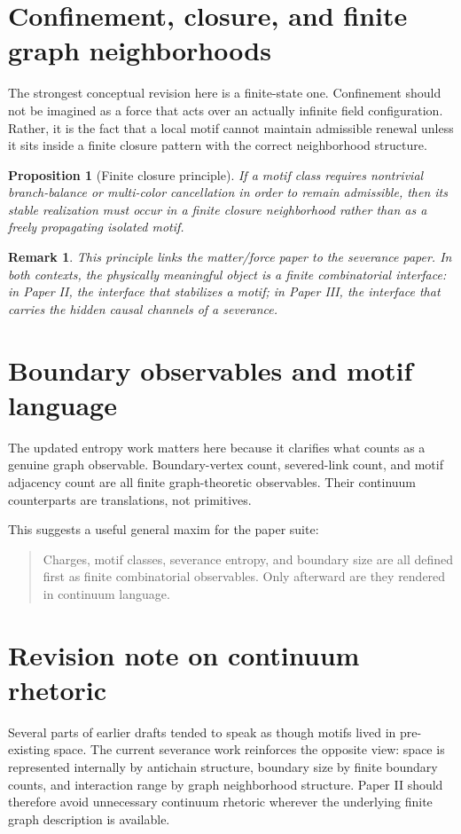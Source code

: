 \documentclass[11pt]{article}
\newtheorem{proposition}{Proposition}
\newtheorem{remark}{Remark}
\begin{document}
\section{Confinement, closure, and finite graph neighborhoods}
The strongest conceptual revision here is a finite-state one. Confinement should not be imagined as a force that acts over an actually infinite field configuration. Rather, it is the fact that a local motif cannot maintain admissible renewal unless it sits inside a finite closure pattern with the correct neighborhood structure.

\begin{proposition}[Finite closure principle]
If a motif class requires nontrivial branch-balance or multi-color cancellation in order to remain admissible, then its stable realization must occur in a finite closure neighborhood rather than as a freely propagating isolated motif.
\end{proposition}

\begin{remark}
This principle links the matter/force paper to the severance paper. In both contexts, the physically meaningful object is a finite combinatorial interface: in Paper II, the interface that stabilizes a motif; in Paper III, the interface that carries the hidden causal channels of a severance.
\end{remark}

\section{Boundary observables and motif language}
The updated entropy work matters here because it clarifies what counts as a genuine graph observable. Boundary-vertex count, severed-link count, and motif adjacency count are all finite graph-theoretic observables. Their continuum counterparts are translations, not primitives.

This suggests a useful general maxim for the paper suite:
\begin{quote}
Charges, motif classes, severance entropy, and boundary size are all defined first as finite combinatorial observables. Only afterward are they rendered in continuum language.
\end{quote}

\section{Revision note on continuum rhetoric}
Several parts of earlier drafts tended to speak as though motifs lived in pre-existing space. The current severance work reinforces the opposite view: space is represented internally by antichain structure, boundary size by finite boundary counts, and interaction range by graph neighborhood structure. Paper II should therefore avoid unnecessary continuum rhetoric wherever the underlying finite graph description is available.
\end{document}
